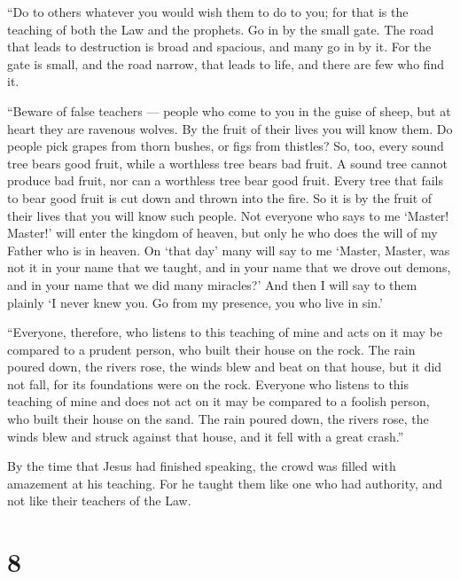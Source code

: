  ``Do to others whatever you would wish them to do to you;
for that is the teaching of both the Law and the prophets. 
Go in by the small gate. The road that leads to destruction is broad and
spacious, and many go in by it.  For the gate is small, and
the road narrow, that leads to life, and there are few who find it.

 ``Beware of false teachers --- people who come to you in
the guise of sheep, but at heart they are ravenous wolves. 
By the fruit of their lives you will know them. Do people pick grapes
from thorn bushes, or figs from thistles?  So, too, every
sound tree bears good fruit, while a worthless tree bears bad fruit.
 A sound tree cannot produce bad fruit, nor can a worthless
tree bear good fruit.  Every tree that fails to bear good
fruit is cut down and thrown into the fire.  So it is by
the fruit of their lives that you will know such people. 
Not everyone who says to me `Master! Master!' will enter the kingdom of
heaven, but only he who does the will of my Father who is in heaven.
 On `that day' many will say to me `Master, Master, was not
it in your name that we taught, and in your name that we drove out
demons, and in your name that we did many miracles?'  And
then I will say to them plainly `I never knew you. Go from my presence,
you who live in sin.'

 ``Everyone, therefore, who listens to this teaching of
mine and acts on it may be compared to a prudent person, who built their
house on the rock.  The rain poured down, the rivers rose,
the winds blew and beat on that house, but it did not fall, for its
foundations were on the rock.  Everyone who listens to this
teaching of mine and does not act on it may be compared to a foolish
person, who built their house on the sand.  The rain poured
down, the rivers rose, the winds blew and struck against that house, and
it fell with a great crash.''

 By the time that Jesus had finished speaking, the crowd
was filled with amazement at his teaching.  For he taught
them like one who had authority, and not like their teachers of the Law.

\hypertarget{section-7}{%
\section{8}\label{section-7}}

